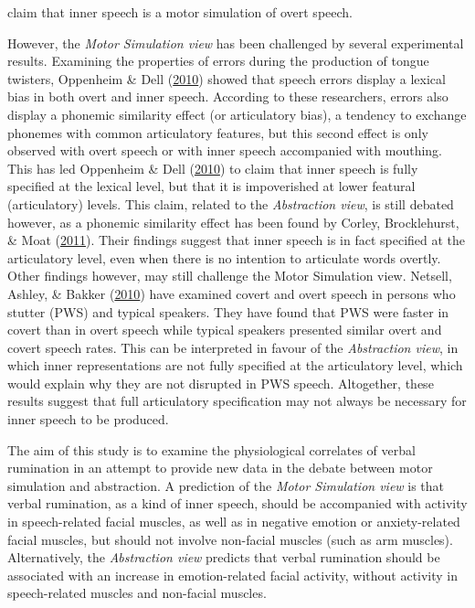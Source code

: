 \documentclass[a4paper,12pt,twoside,openright,oldfontcommands]{memoir}
\begin{document}
claim that inner speech is a motor simulation of overt speech.

However, the \emph{Motor Simulation view} has been challenged by several experimental results. Examining the properties of errors during the production of tongue twisters, Oppenheim \& Dell (\protect\hyperlink{ref-oppenheim_motor_2010}{2010}) showed that speech errors display a lexical bias in both overt and inner speech. According to these researchers, errors also display a phonemic similarity effect (or articulatory bias), a tendency to exchange phonemes with common articulatory features, but this second effect is only observed with overt speech or with inner speech accompanied with mouthing. This has led Oppenheim \& Dell (\protect\hyperlink{ref-oppenheim_motor_2010}{2010}) to claim that inner speech is fully specified at the lexical level, but that it is impoverished at lower featural (articulatory) levels. This claim, related to the \emph{Abstraction view}, is still debated however, as a phonemic similarity effect has been found by Corley, Brocklehurst, \& Moat (\protect\hyperlink{ref-corley_error_2011}{2011}). Their findings suggest that inner speech is in fact specified at the articulatory level, even when there is no intention to articulate words overtly. Other findings however, may still challenge the Motor Simulation view. Netsell, Ashley, \& Bakker (\protect\hyperlink{ref-netsell_inner_2010}{2010}) have examined covert and overt speech in persons who stutter (PWS) and typical speakers. They have found that PWS were faster in covert than in overt speech while typical speakers presented similar overt and covert speech rates. This can be interpreted in favour of the \emph{Abstraction view}, in which inner representations are not fully specified at the articulatory level, which would explain why they are not disrupted in PWS speech. Altogether, these results suggest that full articulatory specification may not always be necessary for inner speech to be produced.

The aim of this study is to examine the physiological correlates of verbal rumination in an attempt to provide new data in the debate between motor simulation and abstraction. A prediction of the \emph{Motor Simulation view} is that verbal rumination, as a kind of inner speech, should be accompanied with activity in speech-related facial muscles, as well as in negative emotion or anxiety-related facial muscles, but should not involve non-facial muscles (such as arm muscles). Alternatively, the \emph{Abstraction view} predicts that verbal rumination should be associated with an increase in emotion-related facial activity, without activity in speech-related muscles and non-facial muscles.
\end{document}
